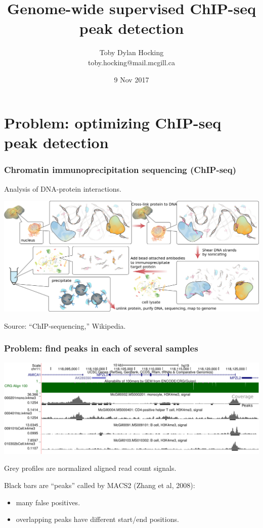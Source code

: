 \documentclass{beamer}
\begin{document}
\title{Genome-wide supervised ChIP-seq peak detection}

\author{
  Toby Dylan Hocking\\
  toby.hocking@mail.mcgill.ca\\
}


\date{9 Nov 2017}

\maketitle

\section{Problem: optimizing ChIP-seq peak detection}

\begin{frame}
  \frametitle{Chromatin immunoprecipitation sequencing (ChIP-seq)}
  Analysis of DNA-protein interactions.

  \includegraphics[width=\textwidth]{Chromatin_immunoprecipitation_sequencing_wide.png}

  Source: ``ChIP-sequencing,'' Wikipedia.
\end{frame}

\begin{frame}
  \frametitle{Problem: find peaks in each of several samples}
  \includegraphics[width=\textwidth]{screenshot-ucsc-edited}

  Grey profiles are normalized aligned read count signals.

  Black bars are ``peaks'' called by MACS2 (Zhang et al, 2008):
  \begin{itemize}
  \item many false positives.
  \item overlapping peaks have different start/end positions.
  \end{itemize}
\end{frame}
\end{document}
